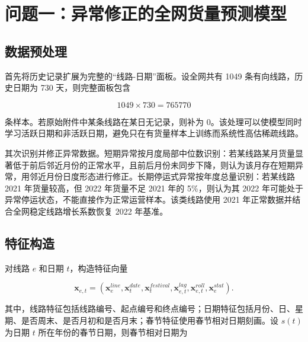 \documentclass[UTF8,zihao=-4,a4paper,fontset=fandol]{ctexart}
\begin{document}
\section{问题一：异常修正的全网货量预测模型}



\subsection{数据预处理}



首先将历史记录扩展为完整的“线路-日期”面板。设全网共有 1049 条有向线路，历史日期为 730 天，则完整面板包含



\begin{equation}
1049 \times 730 = 765770
\end{equation}



条样本。若原始附件中某条线路在某日无记录，则补为 0。该处理可以使模型同时学习活跃日期和非活跃日期，避免只在有货量样本上训练而系统性高估稀疏线路。



其次识别并修正异常数据。短期异常按月度局部中位数识别：若某线路某月货量显著低于前后邻近月份的正常水平，且前后月份未同步下降，则认为该月存在短期异常，用邻近月份日度形态进行修正。长期停运式异常按年度总量识别：若某线路 2021 年货量较高，但 2022 年货量不足 2021 年的 5\%，则认为其 2022 年可能处于异常停运状态，不能直接作为正常运营样本。该类线路使用 2021 年正常数据并结合全网稳定线路增长系数恢复 2022 年基准。



\subsection{特征构造}



对线路 $e$ 和日期 $t$，构造特征向量



\begin{equation}
\mathbf{x}_{e,t}=(\mathbf{x}^{line}_e,\mathbf{x}^{date}_t,\mathbf{x}^{festival}_t,\mathbf{x}^{lag}_{e,t},\mathbf{x}^{roll}_{e,t},\mathbf{x}^{stat}_e).
\end{equation}



其中，线路特征包括线路编号、起点编号和终点编号；日期特征包括月份、日、星期、是否周末、是否月初和是否月末；春节特征使用春节相对日期刻画。设 $s(t)$ 为日期 $t$ 所在年份的春节日期，则春节相对日期为
\end{document}
